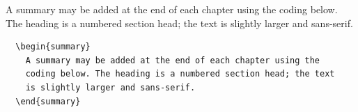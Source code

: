   \begin{summary}
    A summary may be added at the end of each chapter using the
    coding below. The heading is a numbered section head; the text
    is slightly larger and sans-serif.
  \end{summary}
\begin{verbatim}
  \begin{summary}
    A summary may be added at the end of each chapter using the
    coding below. The heading is a numbered section head; the text
    is slightly larger and sans-serif.
  \end{summary}
\end{verbatim}

\endinput

